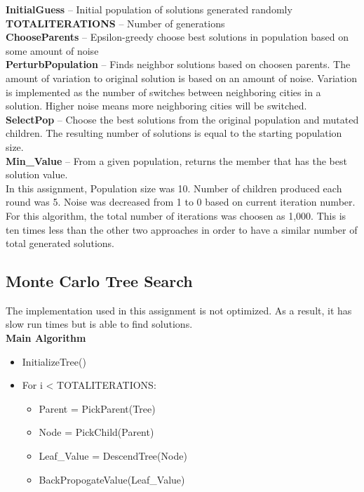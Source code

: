 \textbf{InitialGuess} -- Initial population of solutions generated randomly \\
\textbf{TOTALITERATIONS} -- Number of generations \\
\textbf{ChooseParents} -- Epsilon-greedy choose best solutions in population based on some amount of noise \\
\textbf{PerturbPopulation} -- Finds neighbor solutions based on choosen parents.  The amount of variation to original solution is based on an amount of noise.  Variation is implemented as the number of switches between neighboring cities in a solution.  Higher noise means more neighboring cities will be switched. \\
\textbf{SelectPop} -- Choose the best solutions from the original population and mutated children.  The resulting number of solutions is equal to the starting population size. \\
\textbf{Min\_Value} -- From a given population, returns the member that has the best solution value. \\

In this assignment, Population size was 10.  Number of children produced each round was 5.  Noise was decreased from 1 to 0 based on current iteration number.  For this algorithm, the total number of iterations was choosen as 1,000.  This is ten times less than the other two approaches in order to have a similar number of total generated solutions.  

\subsection{Monte Carlo Tree Search}
The implementation used in this assignment is not optimized.  As a result, it has slow run times but is able to find solutions. \\
\textbf{Main Algorithm}
\begin{itemize}
	\item InitializeTree()
	\item For i < TOTALITERATIONS:
		\begin{itemize}
			\item Parent = PickParent(Tree)
			\item Node = PickChild(Parent)
			\item Leaf\_Value = DescendTree(Node)
			\item BackPropogateValue(Leaf\_Value)
		\end{itemize}
\end{itemize}


